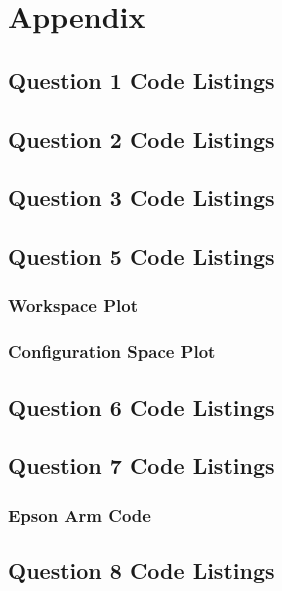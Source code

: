 \newpage
\renewcommand{\thesubsection}{\thesection.\arabic{subsection}}
\section{Appendix}
	\subsection{Question 1 Code Listings}
	
	
	\pagebreak
	\subsection{Question 2 Code Listings}
	
	
	\pagebreak
	\subsection{Question 3 Code Listings}
	
	
	\pagebreak
	\subsection{Question 5 Code Listings}
		\subsubsection{Workspace Plot}
		
		\subsubsection{Configuration Space Plot}
		
		
		
	
	\pagebreak
	\subsection{Question 6 Code Listings}
		
	\pagebreak
	\subsection{Question 7 Code Listings}
			\subsubsection{Epson Arm Code}
			
	\pagebreak
	\subsection{Question 8 Code Listings}
